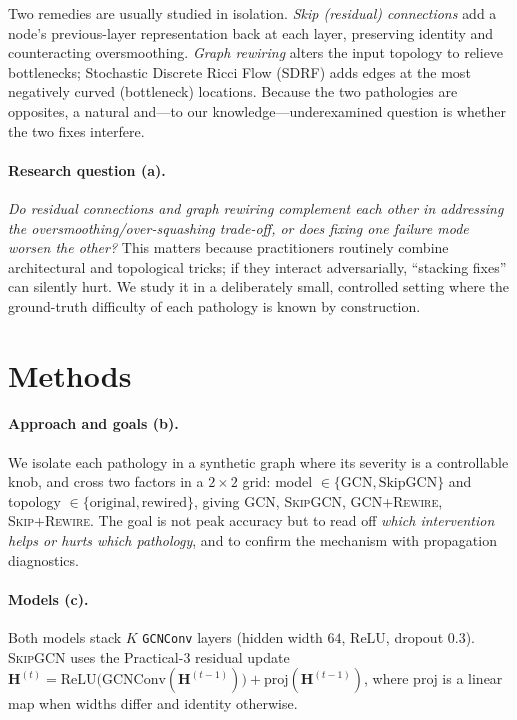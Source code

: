 \documentclass[10pt,a4paper]{article}
\begin{document}
Two remedies are usually studied in isolation. \emph{Skip (residual) connections}
\cite{he2016,xu2018jk} add a node's previous-layer representation back at each
layer, preserving identity and counteracting oversmoothing. \emph{Graph rewiring}
\cite{topping2022} alters the input topology to relieve bottlenecks; Stochastic
Discrete Ricci Flow (SDRF) adds edges at the most negatively curved (bottleneck)
locations. Because the two pathologies are opposites, a natural and---to our
knowledge---underexamined question is whether the two fixes interfere.

\paragraph{Research question (a).}
\emph{Do residual connections and graph rewiring complement each other in
addressing the oversmoothing/over-squashing trade-off, or does fixing one failure
mode worsen the other?} This matters because practitioners routinely combine
architectural and topological tricks; if they interact adversarially, ``stacking
fixes'' can silently hurt. We study it in a deliberately small, controlled setting
where the ground-truth difficulty of each pathology is known by construction.

\section{Methods}
\label{sec:methods}

\paragraph{Approach and goals (b).}
We isolate each pathology in a synthetic graph where its severity is a controllable
knob, and cross two factors in a $2\times2$ grid: model
$\in\{\text{GCN},\text{SkipGCN}\}$ and topology $\in\{\text{original},\text{rewired}\}$,
giving \textsc{GCN}, \textsc{SkipGCN}, \textsc{GCN+Rewire}, \textsc{Skip+Rewire}.
The goal is not peak accuracy but to read off \emph{which intervention helps or
hurts which pathology}, and to confirm the mechanism with propagation diagnostics.

\paragraph{Models (c).}
Both models stack $K$ \texttt{GCNConv} layers (hidden width $64$, ReLU, dropout
$0.3$). \textsc{SkipGCN} uses the Practical-3 residual update
$\bm{H}^{(t)}=\mathrm{ReLU}\big(\mathrm{GCNConv}(\bm{H}^{(t-1)})\big)+
\mathrm{proj}(\bm{H}^{(t-1)})$, where $\mathrm{proj}$ is a linear map when widths
differ and identity otherwise.
\end{document}
